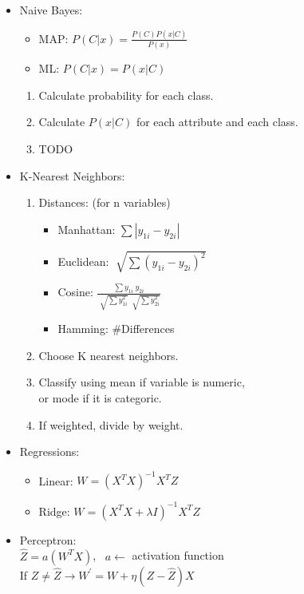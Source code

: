 \documentclass[twocolumn, 10pt]{article}
\begin{document}
\begin{itemize}[leftmargin=*, itemsep=0pt]
    \item Naive Bayes: 
    \begin{itemize}[topsep=0pt, itemsep=0pt]
        \item MAP: $\displaystyle P(C|x)=\frac{P(C)P(x|C)}{P(x)}$
        \item ML: $\displaystyle P(C|x)=P(x|C)$
    \end{itemize}
    \begin{enumerate}[topsep=0pt, itemsep=0pt]
        \item Calculate probability for each class.
        \item Calculate $P(x|C)$ for each attribute and each class.
        \item TODO
    \end{enumerate}
    
    \item K-Nearest Neighbors:
    \begin{enumerate}[topsep=0pt, itemsep=0pt]
        \item Distances: (for n variables)
        \begin{itemize}[topsep=0pt]
            \item Manhattan: $\displaystyle \sum |y_{1i}-y_{2i}|$
            \item Euclidean: $\displaystyle \sqrt[]{\sum (y_{1i}-y_{2i})^2}$
            \item Cosine: $\displaystyle \frac{\sum y_{1i}\ y_{2i}}
            {\sqrt[]{\sum y_{1i}^2}\ \sqrt[]{\sum y_{2i}^2}}$
            \item Hamming: \#Differences
        \end{itemize}
        \item Choose K nearest neighbors.
        \item Classify using mean if variable is numeric, \\
        or mode if it is categoric.
        \item If weighted, divide by weight.
    \end{enumerate}

    \item Regressions:
    \begin{itemize}[topsep=0pt, itemsep=0pt]
        \item Linear: $W=(X^TX)^{-1}X^TZ$
        \item Ridge: $W=(X^TX+\lambda I)^{-1}X^TZ$
    \end{itemize}

    \item Perceptron: \\
    $\hat{Z}=a(W^TX)$, \ $a  \leftarrow$ activation function \\
    If $Z \neq \hat{Z} \longrightarrow W^{'}=W+\eta(Z - \hat{Z})X$  


\end{itemize}
\end{document}
